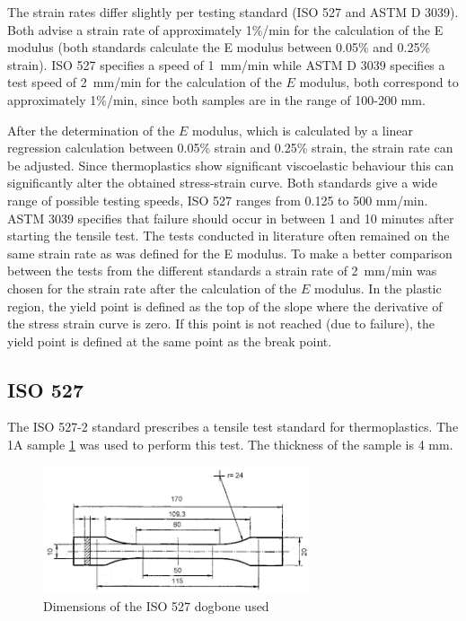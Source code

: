 The strain rates differ slightly per testing standard (ISO 527 and ASTM D 3039). Both advise a strain rate of approximately 1\%/min for the calculation of the E modulus (both standards  calculate the E modulus between 0.05\% and 0.25\% strain).  ISO 527 specifies a speed of 1~mm/min while ASTM D 3039 specifies a test speed of 2~mm/min for the calculation of the $E$ modulus, both correspond to approximately 1\%/min, since both samples are in the range of 100-200 mm.

After the determination of the $E$ modulus, which is calculated by a linear regression calculation between 0.05\% strain and 0.25\% strain, the strain rate can be adjusted. Since thermoplastics show significant viscoelastic behaviour this can significantly alter the obtained stress-strain curve. Both standards give a wide range of possible testing speeds, ISO 527 ranges from 0.125 to 500 mm/min. ASTM 3039 specifies that failure should occur in between 1 and 10 minutes after starting the tensile test. The tests conducted in literature often remained on the same strain rate as was defined for the E modulus. To make a better comparison between the tests from the different standards a strain rate of 2~mm/min was chosen for the strain rate after the calculation of the $E$ modulus.
In the plastic region, the yield point is defined as the top of the slope where the derivative of the stress strain curve is zero. If this point is not reached (due to failure), the yield point is defined at the same point as the break point.

\subsection{ISO 527}
The ISO 527-2 standard \cite{Afd2016NEN-EN-ISO527-2} prescribes a tensile test standard for thermoplastics. The 1A sample \ref{fig:ISO527} was used to perform this test. The thickness of the sample is 4 mm.

\begin{figure}[htb]
    \centering
    \includegraphics[width=0.70\textwidth]{chapter_5_Experimentaltesting/figures/ISO527specimen.png}
    \caption{Dimensions of the ISO 527 dogbone used}
    \label{fig:ISO527}
\end{figure}

